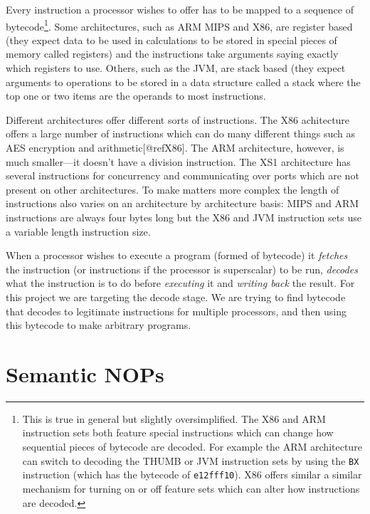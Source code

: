 \documentclass[10pt,]{book}
\begin{document}
Every instruction a processor wishes to offer has to be mapped to a
sequence of bytecode\footnote{This is true in general but slightly
  oversimplified. The X86 and ARM instruction sets both feature special
  instructions which can change how sequential pieces of bytecode are
  decoded. For example the ARM architecture\autocite{Seal:2000vd} can
  switch to decoding the THUMB or JVM instruction sets by using the
  \lstinline!BX! instruction (which has the bytecode of
  \lstinline!e12fff10!). X86\autocite{IntelCorporation:1997ta} offers
  similar a similar mechanism for turning on or off feature sets which
  can alter how instructions are decoded.}. Some architectures, such as
ARM\autocite{Seal:2000vd} MIPS\autocite{MIPSTechnologiesInc:2011ta} and
X86\autocite{IntelCorporation:1997ta}, are register based (they expect
data to be used in calculations to be stored in special pieces of memory
called registers) and the instructions take arguments saying exactly
which registers to use. Others, such as the
JVM\autocite{Lindholm:2012wy}, are stack based (they expect arguments to
operations to be stored in a data structure called a stack where the top
one or two items are the operands to most instructions.

Different architectures offer different sorts of instructions. The X86
achitecture offers a large number of instructions which can do many
different things such as AES encryption and arithmetic{[}@refX86{]}. The
ARM architecture\autocite{Seal:2000vd}, however, is much smaller---it
doesn't have a division instruction. The XS1
architecture\autocite{May:ua} has several instructions for concurrency
and communicating over ports which are not present on other
architectures. To make matters more complex the length of instructions
also varies on an architecture by architecture basis: MIPS and ARM
instructions are always four bytes long but the X86 and JVM instruction
sets use a variable length instruction size.

When a processor wishes to execute a program (formed of bytecode) it
\emph{fetches} the instruction (or instructions if the processor is
superscalar) to be run, \emph{decodes} what the instruction is to do
before \emph{executing} it and \emph{writing back} the result. For this
project we are targeting the decode stage. We are trying to find
bytecode that decodes to legitimate instructions for multiple
processors, and then using this bytecode to make arbitrary programs.

\section{Semantic NOPs}
\end{document}
